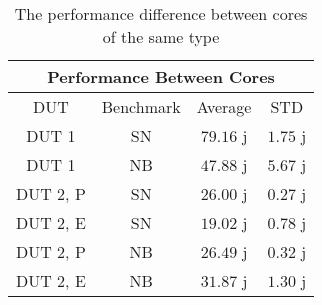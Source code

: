 \begin{table}[H]
    \centering
    \begin{tabular}{|| c | c | c | c ||}
    \hline
    \multicolumn{4}{||c||}{Performance Between Cores} \\ [0.5ex] \hline\hline
    DUT & Benchmark & Average & STD \\\hline
    DUT 1 & SN & $79.16$ j & $1.75$ j\\
    DUT 1 & NB & $47.88$ j & $5.67$ j\\
    DUT 2, P & SN & $26.00$ j & $0.27$ j\\
    DUT 2, E & SN & $19.02$ j & $0.78$ j\\
    DUT 2, P & NB & $26.49$ j & $0.32$ j\\
    DUT 2, E & NB & $31.87$ j & $1.30$ j\\\hline
    \end{tabular}
    \caption{The performance difference between cores of the same type}
    \label{tab:dut-2-exp-3-std-and-avg}
\end{table}









